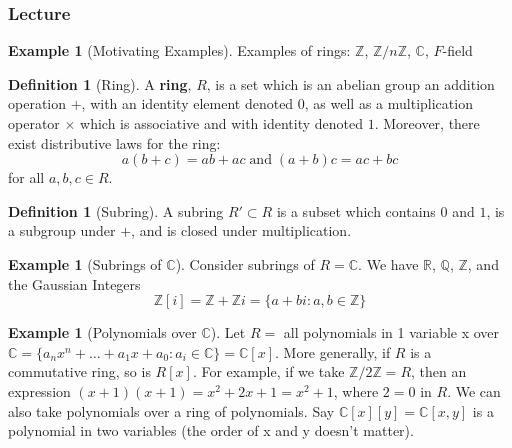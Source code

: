 \documentclass[12pt]{article}
\theoremstyle{definition}
\newtheorem{defn}[thm]{Definition}
\newtheorem{eg}[thm]{Example}
\theoremstyle{remark}
\numberwithin{equation}{section}
\newcommand\C{\mathbb C}    %
\newcommand\R{\mathbb R}    %
\newcommand\Z{\mathbb Z}    %
\newcommand\Q{\mathbb Q}    %
\newcommand\B[1]{\textbf{ #1}}
\begin{document}
\vspace{15pt}

\subsubsection{Lecture}

\begin{eg}[Motivating Examples]
        Examples of rings: $\Z$, $\Z/n\Z$, $\C$, $F$-field
\end{eg}

\vspace{15pt}


\begin{defn}[Ring]
        A \B{ring}, $R$, is a set which is an abelian group an addition operation $+$, with an identity element denoted $0$, as well as a multiplication operator $\times$ which is associative and with identity denoted $1$. Moreover, there exist distributive laws for the ring: \begin{equation}
                a(b+c) = ab+ac\;\text{and}\;(a+b)c = ac+bc
        \end{equation}
        for all $a,b,c \in R$.
\end{defn}


\vspace{15pt}

\begin{defn}[Subring]
        A subring $R' \subset R$ is a subset which contains $0$ and $1$, is a subgroup under $+$, and is closed under multiplication.
\end{defn}

\vspace{15pt}

\begin{eg}[Subrings of $\C$]
        Consider subrings of $R = \C$. We have $\R$, $\Q$, $\Z$, and the Gaussian Integers \begin{equation}
                \Z[i] = \Z + \Z i = \{a+bi : a,b \in \Z\}
        \end{equation}
\end{eg}

\vspace{15pt}

\begin{eg}[Polynomials over $\C$]
        Let $R =$ all polynomials in 1 variable x over $\C = \{a_nx^n+\hdots +a_1x + a_0: a_i \in \C\} = \C[x]$. More generally, if $R$ is a commutative ring, so is $R[x]$. For example, if we take $\Z/2\Z = R$, then an expression $(x+1)(x+1) = x^2+2x+1 = x^2 + 1$, where $2=0$ in $R$. We can also take polynomials over a ring of polynomials. Say $\C[x][y] = \C[x,y]$ is a polynomial in two variables (the order of x and y doesn't matter).
\end{eg}
\end{document}
